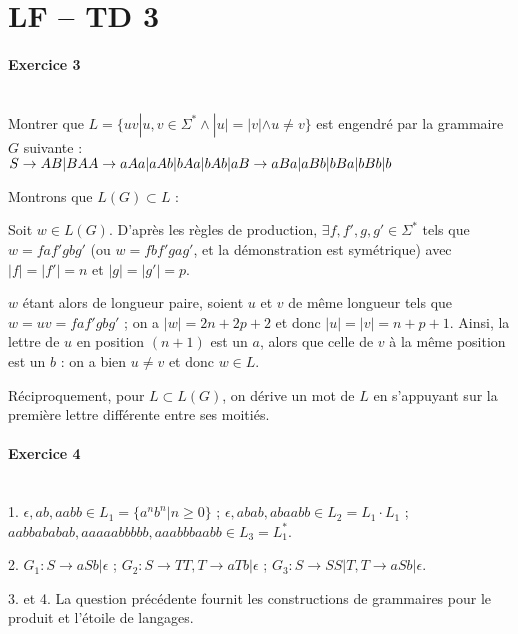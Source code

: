 \documentclass[a4paper]{article}
\begin{document}
\section*{LF -- TD 3}

\paragraph{Exercice 3}~\\
Montrer que $L=\{uv | u,v\in\Sigma^* \wedge |u| = |v| \wedge u\neq v\}$ est engendré par la grammaire $G$ suivante :\\
$S\rightarrow AB|BA\\
A\rightarrow aAa|aAb|bAa|bAb|a\\
B\rightarrow aBa|aBb|bBa|bBb|b$

Montrons que $L(G) \subset L$ :

Soit $w\in L(G)$. D'après les règles de production, $\exists f,f',g,g' \in\Sigma^*$ tels que $w=faf'gbg'$ (ou $w=fbf'gag'$, et la démonstration est symétrique) avec $|f|=|f'|=n$ et $|g|=|g'|=p$.

$w$ étant alors de longueur paire, soient $u$ et $v$ de même longueur tels que $w=uv=faf'gbg'$ ; on a $|w|=2n+2p+2$ et donc $|u|=|v|=n+p+1$. Ainsi, la lettre de $u$ en position $(n+1)$ est un $a$, alors que celle de $v$ à la même position est un $b$ : on a bien $u\neq v$ et donc $w\in L$.

Réciproquement, pour $L \subset L(G)$, on dérive un mot de $L$ en s'appuyant sur la première lettre différente entre ses moitiés.

\paragraph{Exercice 4}~\\
1. $\epsilon, ab, aabb \in L_1=\{a^nb^n|n\geqslant 0\}$ ; $\epsilon, abab, abaabb \in L_2=L_1\cdot L_1$ ;\\
$aabbababab, aaaaabbbbb, aaabbbaabb \in L_3=L_1^*$.

2. $G_1 : S\rightarrow aSb|\epsilon$ ; $G_2 : S\rightarrow TT, T\rightarrow aTb|\epsilon$ ; $G_3 : S\rightarrow SS | T, T\rightarrow aSb|\epsilon$.

3. et 4. La question précédente fournit les constructions de grammaires pour le produit et l'étoile de langages.
\end{document}
